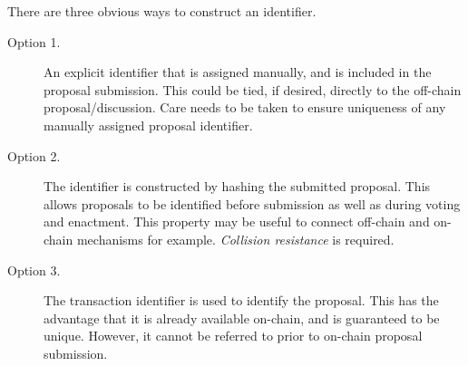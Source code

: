 There are three obvious ways to construct an identifier.

\begin{description}
\item
  [Option 1.]
  An explicit identifier that is assigned manually, and is included in the proposal submission.  This could be tied, if desired, directly to the off-chain proposal/discussion.
  Care needs to be taken to ensure uniqueness of any manually assigned proposal identifier.
\item
  [Option 2.]
  The identifier is constructed by hashing the submitted proposal.  This allows proposals to be identified before submission as well as during voting and enactment.  This property may be
  useful to connect off-chain and on-chain mechanisms for example.  \emph{Collision resistance} is required.
\item
  [Option 3.]
  The transaction identifier is used to identify the proposal.  This has the advantage that it is already available on-chain, and is guaranteed to be unique.  However, it cannot be
  referred to prior to on-chain proposal submission.
\end{description}
